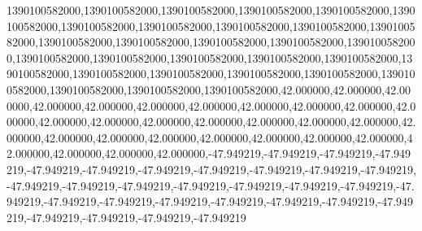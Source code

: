 1390100582000,1390100582000,1390100582000,1390100582000,1390100582000,1390100582000,1390100582000,1390100582000,1390100582000,1390100582000,1390100582000,1390100582000,1390100582000,1390100582000,1390100582000,1390100582000,1390100582000,1390100582000,1390100582000,1390100582000,1390100582000,1390100582000,1390100582000,1390100582000,1390100582000,1390100582000,1390100582000,1390100582000,1390100582000,1390100582000,42.000000,42.000000,42.000000,42.000000,42.000000,42.000000,42.000000,42.000000,42.000000,42.000000,42.000000,42.000000,42.000000,42.000000,42.000000,42.000000,42.000000,42.000000,42.000000,42.000000,42.000000,42.000000,42.000000,42.000000,42.000000,42.000000,42.000000,42.000000,42.000000,42.000000,-47.949219,-47.949219,-47.949219,-47.949219,-47.949219,-47.949219,-47.949219,-47.949219,-47.949219,-47.949219,-47.949219,-47.949219,-47.949219,-47.949219,-47.949219,-47.949219,-47.949219,-47.949219,-47.949219,-47.949219,-47.949219,-47.949219,-47.949219,-47.949219,-47.949219,-47.949219,-47.949219,-47.949219,-47.949219,-47.949219

